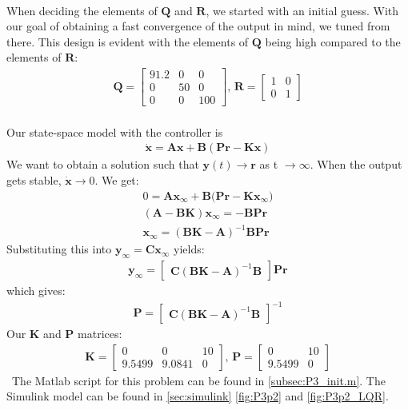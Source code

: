 \\When deciding the elements of $\mathbf{Q}$ and $\mathbf{R}$, we started with an initial guess. With our goal of obtaining a fast convergence of the output in mind, we tuned from there. This design is evident with the elements of $\mathbf{Q}$ being high compared to the elements of $\mathbf{R}$:
\begin{gather*}
    \mathbf{Q} = \begin{bmatrix}
    91.2 & 0 & 0 \\ 
    0 & 50 & 0 \\
    0 & 0 & 100 \end{bmatrix}\textbf{, } \mathbf{R} = \begin{bmatrix} 1 & 0 \\ 0 & 1 \end{bmatrix}
\end{gather*}
\\Our state-space model with the controller is
\begin{gather*}
     \mathbf{\dot{x}} = \mathbf{Ax} + \mathbf{B}(\mathbf{Pr} - \mathbf{Kx})
\end{gather*}
We want to obtain a solution such that  \( \mathbf{y}(t) \rightarrow \mathbf{r} \)  as t \(\rightarrow \infty\). When the output gets stable,  
\(\mathbf{\dot{x}} \rightarrow 0\). We get:
\begin{gather*}
    0 = \mathbf{Ax_\infty} + \mathbf{B}(\mathbf{Pr} - \mathbf{Kx_\infty)} \\
    (\mathbf{A} - \mathbf{BK})\mathbf{x_\infty} = -\mathbf{BPr} \\
    \mathbf{x_\infty} = (\mathbf{BK} - \mathbf{A})^{-1}
    \mathbf{BPr}
\end{gather*}
Substituting this into \(\mathbf{y_\infty} = \mathbf{Cx_\infty}\) yields:      
\begin{gather*}
    \mathbf{y_\infty} = 
    \begin{bmatrix} \mathbf{C}(\mathbf{BK} - \mathbf{A})^{-1} \mathbf{B}\end{bmatrix}\mathbf{Pr}
\end{gather*}
which gives:
\begin{gather*}
    \mathbf{P} = 
    \begin{bmatrix}\mathbf{C}(\mathbf{BK} - \mathbf{A})^{-1}\mathbf{B}\end{bmatrix}^{-1}
\end{gather*}
Our \textbf{K} and \textbf{P} matrices:
\begin{gather*}
    \mathbf{K} = \begin{bmatrix}
    0 & 0 & 10 \\
    9.5499 & 9.0841 & 0 \end{bmatrix}\textbf{, } \mathbf{P} =
    \begin{bmatrix} 0 & 10 \\ 9.5499 & 0 \end{bmatrix}
\end{gather*}
\ The Matlab script for this problem can be found in \cref{subsec:P3_init.m}. The Simulink model can be found in \cref{sec:simulink} \cref{fig:P3p2} and \cref{fig:P3p2_LQR}.


